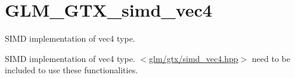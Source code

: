 \hypertarget{group__gtx__simd__vec4}{\section{G\-L\-M\-\_\-\-G\-T\-X\-\_\-simd\-\_\-vec4}
\label{group__gtx__simd__vec4}
}


S\-I\-M\-D implementation of vec4 type.  


S\-I\-M\-D implementation of vec4 type. $<$\hyperlink{simd__vec4_8hpp}{glm/gtx/simd\-\_\-vec4.\-hpp}$>$ need to be included to use these functionalities. 